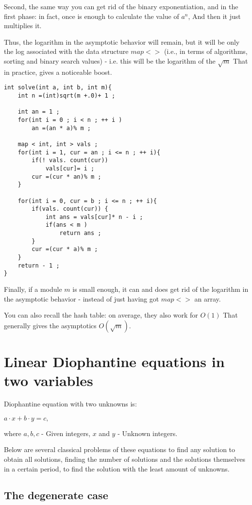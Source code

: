 Second, the same way you can get rid of the binary exponentiation, and in the first phase: in fact, once is enough to calculate the value of $a ^ n$, And then it just multiplies it.

Thus, the logarithm in the asymptotic behavior will remain, but it will be only the log associated with the data structure $map <>$ (i.e., in terms of algorithms, sorting and binary search values) - i.e. this will be the logarithm of the $\sqrt {m}$ That in practice, gives a noticeable boost.

\begin{verbatim}
int solve(int a, int b, int m){
    int n =(int)sqrt(m +.0)+ 1 ;
 
    int an = 1 ;
    for(int i = 0 ; i < n ; ++ i )
        an =(an * a)% m ;
 
    map < int, int > vals ;
    for(int i = 1, cur = an ; i <= n ; ++ i){
        if(! vals. count(cur))
            vals[cur]= i ;
        cur =(cur * an)% m ;
    }
 
    for(int i = 0, cur = b ; i <= n ; ++ i){
        if(vals. count(cur)) {
            int ans = vals[cur]* n - i ;
            if(ans < m )
                return ans ;
        }
        cur =(cur * a)% m ;
    }
    return - 1 ;
} 
\end{verbatim}
Finally, if a module $m$ is small enough, it can and does get rid of the logarithm in the asymptotic behavior - instead of just having got $map <>$ an array.

You can also recall the hash table: on average, they also work for $O (1)$ That generally gives the asymptotics $O (\sqrt {m})$.

\section{ Linear Diophantine equations in two variables }
Diophantine equation with two unknowns is:

$a \cdot x + b \cdot y = c,$

where $a, b, c$ - Given integers, $x$ and $y$ - Unknown integers.

Below are several classical problems of these equations to find any solution to obtain all solutions, finding the number of solutions and the solutions themselves in a certain period, to find the solution with the least amount of unknowns.

\subsection{ The degenerate case }

